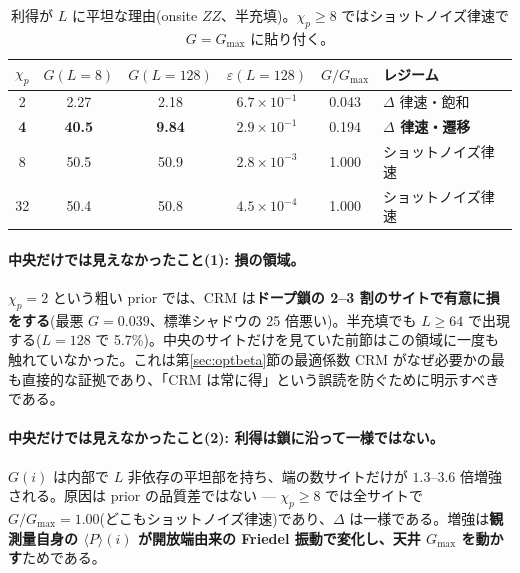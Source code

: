 \documentclass[11pt,a4paper]{ltjsarticle}
\newcommand{\ev}[1]{\langle #1\rangle}
\begin{document}
\begin{table}[t]
\centering\small
\caption{利得が $L$ に平坦な理由(onsite $ZZ$、半充填)。$\chi_p\ge8$ ではショットノイズ律速で $G=G_{\max}$ に貼り付く。}
\label{tab:whyflat}
\begin{tabular}{@{}cccccl@{}}
\toprule
$\chi_p$ & $G(L{=}8)$ & $G(L{=}128)$ & $\varepsilon(L{=}128)$ & $G/G_{\max}$ & レジーム \\
\midrule
2  & 2.27 & 2.18 & $6.7\times10^{-1}$ & 0.043 & $\Delta$ 律速・飽和 \\
\textbf{4} & \textbf{40.5} & \textbf{9.84} & $2.9\times10^{-1}$ & 0.194 & \textbf{$\Delta$ 律速・遷移} \\
8  & 50.5 & 50.9 & $2.8\times10^{-3}$ & 1.000 & ショットノイズ律速 \\
32 & 50.4 & 50.8 & $4.5\times10^{-4}$ & 1.000 & ショットノイズ律速 \\
\bottomrule
\end{tabular}
\end{table}

\paragraph{中央だけでは見えなかったこと(1): 損の領域。}$\chi_p=2$ という粗い prior では、CRM は\textbf{ドープ鎖の 2--3 割のサイトで有意に損をする}(最悪 $G=0.039$、標準シャドウの 25 倍悪い)。半充填でも $L\ge64$ で出現する($L=128$ で 5.7\%)。中央のサイトだけを見ていた前節はこの領域に一度も触れていなかった。これは第\ref{sec:optbeta}節の最適係数 CRM がなぜ必要かの最も直接的な証拠であり、「CRM は常に得」という誤読を防ぐために明示すべきである。

\paragraph{中央だけでは見えなかったこと(2): 利得は鎖に沿って一様ではない。}$G(i)$ は内部で $L$ 非依存の平坦部を持ち、端の数サイトだけが $1.3$--$3.6$ 倍増強される。原因は prior の品質差ではない --- $\chi_p\ge8$ では全サイトで $G/G_{\max}=1.00$(どこもショットノイズ律速)であり、$\Delta$ は一様である。増強は\textbf{観測量自身の $\ev{P}(i)$ が開放端由来の Friedel 振動で変化し、天井 $G_{\max}$ を動かす}ためである。
\end{document}
